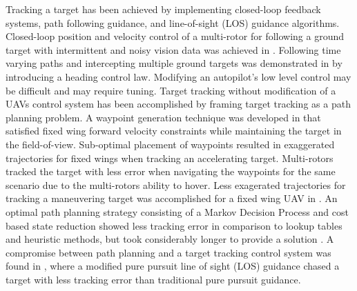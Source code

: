 \documentclass[conference]{IEEEtran}
\begin{document}

Tracking a target has been achieved by implementing closed-loop feedback systems, path following guidance, and line-of-sight (LOS) guidance algorithms. Closed-loop position and velocity control of a multi-rotor for following a ground target with intermittent and noisy vision data was achieved in \cite{teuliere_chasing_2011}. Following time varying paths and intercepting multiple ground targets was demonstrated in \cite{oliveira_moving_2016} by introducing a heading control law. Modifying an autopilot's low level control may be difficult and may require tuning.
Target tracking without modification of a UAVs control system has been accomplished by framing target tracking as a path planning problem. A waypoint generation technique was developed in \cite{ariyur_autonomous_2008} that satisfied fixed wing forward velocity constraints while maintaining the target in the field-of-view. Sub-optimal placement of waypoints resulted in exaggerated trajectories for fixed wings when tracking an accelerating target. Multi-rotors tracked the target with less error when navigating the waypoints for the same scenario due to the multi-rotors ability to hover. Less exagerated trajectories for tracking a maneuvering target was accomplished for a fixed wing UAV in \cite{lee_strategies_2003}. An optimal path planning strategy consisting of a Markov Decision Process and cost based state reduction showed less tracking error in comparison to lookup tables and heuristic methods, but took considerably longer to provide a solution \cite{baek_optimal_2013}. A compromise between path planning and a target tracking control system was found in \cite{yamasaki_advanced_2009}, where a modified pure pursuit line of sight (LOS) guidance chased a target with less tracking error than traditional pure pursuit guidance\cite{yamasaki_advanced_2009}. 
\end{document}
